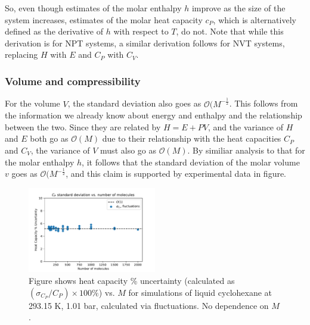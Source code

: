 \documentclass[9pt,bestpractices]{livecoms}
\begin{document}
So, even though estimates of the molar enthalpy $h$ improve as the size of the system increases, estimates of the molar heat capacity $c_P$, which is alternatively defined as the derivative of $h$ with respect to $T$, do not.  Note that while this derivation is for NPT systems, a similar derivation follows for NVT systems, replacing $H$ with $E$ and $C_P$ with $C_V$.

\subsubsection{Volume and compressibility}

For the volume $V$, the standard deviation also goes as $\mathcal{O}(M^{-\frac{1}{2}}$.  This follows from the information we already know about energy and enthalpy and the relationship between the two.  Since they are related by $H=E+PV$, and the variance of $H$ and $E$ both go as $\mathcal{O}(M)$ due to their relationship with the heat capacities $C_P$ and $C_V$, the variance of $V$ must also go as $\mathcal{O}(M)$.  By similiar analysis to that for the molar enthalpy $h$, it follows that the standard deviation of the molar volume $v$ goes as $\mathcal{O}(M^{-\frac{1}{2}}$, and this claim is supported by experimental data in figure. %
\begin{figure}[H]
\includegraphics[width=0.5\textwidth]{cp_stdev_vs_number_of_molecules.pdf}
\caption{Figure shows heat capacity \% uncertainty (calculated as $(\sigma_{C_P}/C_P) \times 100 \%$) vs. $M$ for simulations of liquid cyclohexane at 293.15 K, 1.01 bar, calculated via fluctuations. No dependence on $M$.}
\end{figure}
\end{document}
